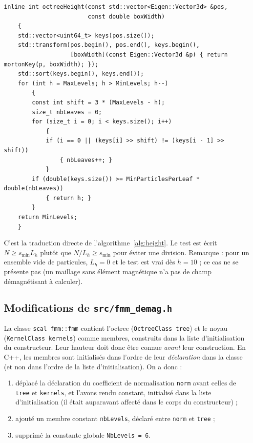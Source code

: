 \documentclass[11pt,a4paper]{article}
\newcommand{\code}[1]{\texttt{#1}}
\begin{document}
\begin{lstlisting}[caption={Calcul de la hauteur (\code{src/octree\_height.h}).}]
inline int octreeHeight(const std::vector<Eigen::Vector3d> &pos,
                        const double boxWidth)
    {
    std::vector<uint64_t> keys(pos.size());
    std::transform(pos.begin(), pos.end(), keys.begin(),
                   [boxWidth](const Eigen::Vector3d &p) { return mortonKey(p, boxWidth); });
    std::sort(keys.begin(), keys.end());
    for (int h = MaxLevels; h > MinLevels; h--)
        {
        const int shift = 3 * (MaxLevels - h);
        size_t nbLeaves = 0;
        for (size_t i = 0; i < keys.size(); i++)
            {
            if (i == 0 || (keys[i] >> shift) != (keys[i - 1] >> shift))
                { nbLeaves++; }
            }
        if (double(keys.size()) >= MinParticlesPerLeaf * double(nbLeaves))
            { return h; }
        }
    return MinLevels;
    }
\end{lstlisting}

C'est la traduction directe de l'algorithme~\ref{alg:height}. Le test est écrit
$N \ge s_{\min} L_h$ plutôt que $N / L_h \ge s_{\min}$ pour éviter une division. Remarque : pour
un ensemble vide de particules, $L_h = 0$ et le test est vrai dès $h = 10$ ; ce cas ne se
présente pas (un maillage sans élément magnétique n'a pas de champ démagnétisant à calculer).

\subsection{\texorpdfstring{Modifications de \code{src/fmm\_demag.h}}{Modifications de src/fmm\_demag.h}}

La classe \code{scal\_fmm::fmm} contient l'octree (\code{OctreeClass tree}) et le noyau
(\code{KernelClass kernels}) comme membres, construits dans la liste d'initialisation du
constructeur. Leur hauteur doit donc être connue \emph{avant} leur construction. En C++, les
membres sont initialisés dans l'ordre de leur \emph{déclaration} dans la classe (et non dans
l'ordre de la liste d'initialisation). On a donc :
\begin{enumerate}
  \item déplacé la déclaration du coefficient de normalisation \code{norm} avant celles de
        \code{tree} et \code{kernels}, et l'avons rendu constant, initialisé dans la liste
        d'initialisation (il était auparavant affecté dans le corps du constructeur) ;
  \item ajouté un membre constant \code{nbLevels}, déclaré entre \code{norm} et \code{tree} ;
  \item supprimé la constante globale \code{NbLevels = 6}.
\end{enumerate}
\end{document}
